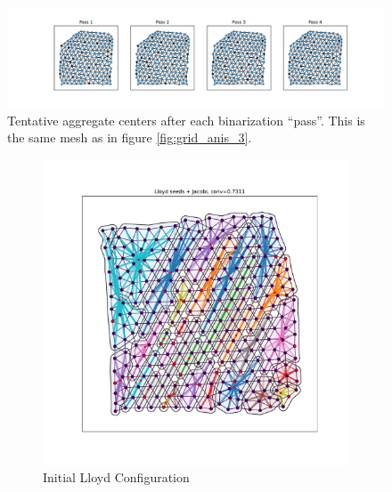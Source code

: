 \documentclass{article}
\begin{document}
\begin{figure}[h]
  \centering
  \includegraphics[width=\textwidth, trim=120 0 100 0, clip]{grid_anis_3_agg_pass.pdf}
  \caption{Tentative aggregate centers after each binarization ``pass''.  This is the same mesh as in figure \ref{fig:grid_anis_3}.}
\end{figure}

\begin{figure}[h]
  \centering
  \begin{subfigure}[t]{0.32\textwidth}
    \centering
    \includegraphics[width=\textwidth, trim=80 70 70 50, clip]{grid_anis_4_dumb.pdf}
    \caption{Initial Lloyd Configuration}
  \end{subfigure}
  \begin{subfigure}[t]{0.32\textwidth}
    \centering

\end{subfigure}
\end{figure}
\end{document}
